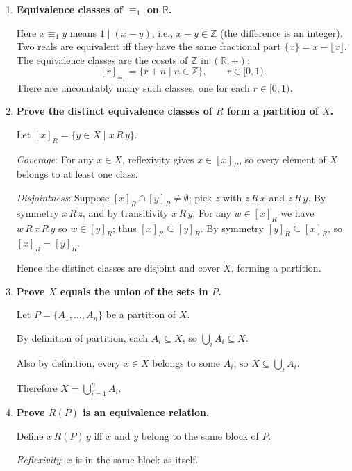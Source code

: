 \documentclass[11pt]{book}
\def\RN{\mathbb{R}}
\begin{document}
\begin{enumerate}[{0.}1. ]
\item \textbf{Equivalence classes of $\equiv_1$ on $\RN$.}

Here $x \equiv_1 y$ means $1 \mid (x-y)$, i.e., $x - y \in \mathbb{Z}$ (the difference is an integer).
Two reals are equivalent iff they have the same fractional part $\{x\} = x - \lfloor x\rfloor$.
The equivalence classes are the cosets of $\mathbb{Z}$ in $(\mathbb{R},+)$:
\[
  [r]_{\equiv_1} = \{r + n \mid n \in \mathbb{Z}\}, \qquad r \in [0,1).
\]
There are uncountably many such classes, one for each $r \in [0,1)$.

\item \textbf{Prove the distinct equivalence classes of $R$ form a partition of $X$.}

Let $[x]_R = \{y \in X \mid x\,R\,y\}$.

\textit{Coverage}: For any $x \in X$, reflexivity gives $x \in [x]_R$, so every element of $X$ belongs to at least one class.

\textit{Disjointness}: Suppose $[x]_R \cap [y]_R \neq \emptyset$; pick $z$ with $z\,R\,x$ and $z\,R\,y$. By symmetry $x\,R\,z$, and by transitivity $x\,R\,y$. For any $w \in [x]_R$ we have $w\,R\,x\,R\,y$ so $w \in [y]_R$; thus $[x]_R \subseteq [y]_R$. By symmetry $[y]_R \subseteq [x]_R$, so $[x]_R = [y]_R$.

Hence the distinct classes are disjoint and cover $X$, forming a partition.

\item \textbf{Prove $X$ equals the union of the sets in $P$.}

Let $P = \{A_1,\ldots,A_n\}$ be a partition of $X$.

By definition of partition, each $A_i \subseteq X$, so $\bigcup_i A_i \subseteq X$.

Also by definition, every $x \in X$ belongs to some $A_i$, so $X \subseteq \bigcup_i A_i$.

Therefore $X = \bigcup_{i=1}^n A_i$.

\item \textbf{Prove $R(P)$ is an equivalence relation.}

Define $x\,R(P)\,y$ iff $x$ and $y$ belong to the same block of $P$.

\textit{Reflexivity}: $x$ is in the same block as itself.


\end{enumerate}
\end{document}
